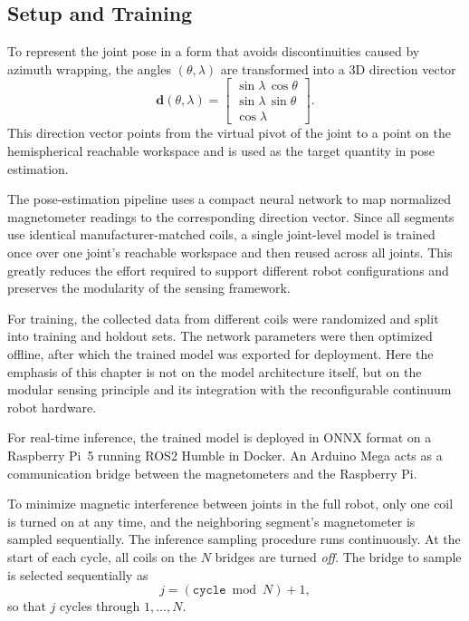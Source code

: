 \subsection{Setup and Training}

To represent the joint pose in a form that avoids discontinuities caused by azimuth wrapping, the angles \((\theta,\lambda)\) are transformed into a 3D direction vector
\begin{equation}
    \mathbf d(\theta,\lambda)=
    \begin{bmatrix}
    \sin\lambda \,\cos\theta\\[4pt]
    \sin\lambda \,\sin\theta\\[4pt]
    \cos\lambda
    \end{bmatrix}.
\end{equation}
This direction vector points from the virtual pivot of the joint to a point on the hemispherical reachable workspace and is used as the target quantity in pose estimation.

The pose-estimation pipeline uses a compact neural network to map normalized magnetometer readings to the corresponding direction vector. Since all segments use identical manufacturer-matched coils, a single joint-level model is trained once over one joint's reachable workspace and then reused across all joints. This greatly reduces the effort required to support different robot configurations and preserves the modularity of the sensing framework.

For training, the collected data from different coils were randomized and split into training and holdout sets. The network parameters were then optimized offline, after which the trained model was exported for deployment. Here the emphasis of this chapter is not on the model architecture itself, but on the modular sensing principle and its integration with the reconfigurable continuum robot hardware.

For real-time inference, the trained model is deployed in ONNX format on a Raspberry Pi~5 running ROS2 Humble in Docker. An Arduino Mega acts as a communication bridge between the magnetometers and the Raspberry Pi.

To minimize magnetic interference between joints in the full robot, only one coil is turned on at any time, and the neighboring segment's magnetometer is sampled sequentially. The inference sampling procedure runs continuously. At the start of each cycle, all coils on the \(N\) bridges are turned \emph{off}. The bridge to sample is selected sequentially as
\begin{equation}
    j = (\texttt{cycle} \bmod N) + 1,
\end{equation}
so that \(j\) cycles through \(1,\dots,N\).

